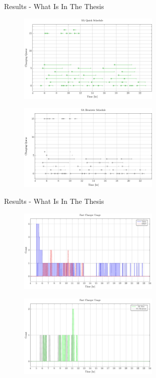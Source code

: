 \documentclass[bigger]{beamer}
\begin{document}
\begin{frame}[label={sec:orgfc425df}]{Results - What Is In The Thesis}
\begin{figure}[htpb]
\centering
    \includegraphics[width=0.6\textwidth]{img/sa-pap-paper/schedule-sa-quick}
\end{figure}
\begin{figure}[htpb]
\centering
    \includegraphics[width=0.6\textwidth]{img/sa-pap-paper/schedule-sa-heuristic}
\end{figure}
\end{frame}

\begin{frame}[label={sec:orgf0eb70b}]{Results - What Is In The Thesis}
\begin{figure}[htpb]
\centering
    \includegraphics[width=0.6\textwidth]{img/sa-pap-paper/charger-count-fast-milp-qin}
\end{figure}
\begin{figure}[htpb]
\centering
    \includegraphics[width=0.6\textwidth]{img/sa-pap-paper/charger-count-fast-sa}
\end{figure}
\end{frame}
\end{document}
